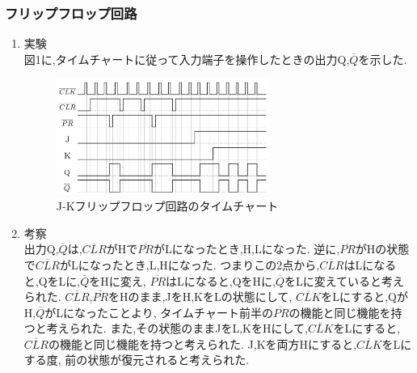 \documentclass[twocolumn, 10pt,a4j]{jsarticle}
\begin{document}
    \subsubsection{フリップフロップ回路}
        \begin{enumerate}
          \item 実験 \\
            図1に,タイムチャートに従って入力端子を操作したときの出力Q,$\overline{Q}$を示した.
              \begin{figure}[H]
                \begin{center}
                  \includegraphics[width=7cm]{../img/junjokairo/jk_flip_flop_time_chart.png}
                  \caption{J-Kフリップフロップ回路のタイムチャート}
                \end{center}
              \end{figure}
          \item 考察 \\
            出力Q,$\overline{Q}$は,$\overline{CLR}$がHで$\overline{PR}$がLになったとき,H,Lになった.
            逆に,$\overline{PR}$がHの状態で$\overline{CLR}$がLになったとき,L,Hになった.
            つまりこの2点から,$\overline{CLR}$はLになると,QをLに,$\overline{Q}$をHに変え,
            $\overline{PR}$はLになると,QをHに,$\overline{Q}$をLに変えていると考えられた.
            $\overline{CLR}$,$\overline{PR}$をHのまま,JをH,KをLの状態にして,
            $\overline{CLK}$をLにすると,QがH,$\overline{Q}$がLになったことより,
            タイムチャート前半の$\overline{PR}$の機能と同じ機能を持つと考えられた.
            また,その状態のままJをL,KをHにして,$\overline{CLK}$をLにすると,
            $\overline{CLR}$の機能と同じ機能を持つと考えられた.
            J,Kを両方Hにすると,$\overline{CLK}$をLにする度,
            前の状態が復元されると考えられた.
        \end{enumerate}
\end{document}
